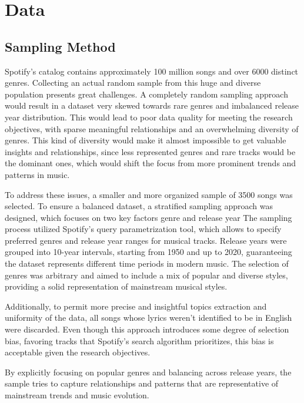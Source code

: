 \chapter{Data}
\label{cha:data}



\section{Sampling Method}
\label{sec:samplingmethod}

Spotify’s catalog contains approximately 100 million songs and over 6000 distinct genres.
Collecting an actual random sample from this huge and diverse population presents great
challenges. A completely random sampling approach would result in a dataset very
skewed towards rare genres and imbalanced release year distribution. This would lead to
poor data quality for meeting the research objectives, with sparse meaningful relationships
and an overwhelming diversity of genres. \textbf{}
This kind of diversity would make it almost impossible to get valuable insights and relationships, since less represented genres and rare tracks would be the dominant ones, which would shift the focus from more prominent trends and patterns in music.


To address these issues, a smaller and more organized sample of 3500 songs was
selected. To ensure a balanced dataset, a stratified sampling approach was designed, which focuses on two key factors genre and release year The sampling process utilized Spotify’s query parametrization tool, which allows to specify preferred genres and release
year ranges for musical tracks. Release years were grouped into 10-year intervals, starting
from 1950 and up to 2020, guaranteeing the dataset represents different time periods in
modern music. The selection of genres was arbitrary and aimed to include a mix of popular
and diverse styles, providing a solid representation of mainstream musical styles.


Additionally, to permit more precise and insightful topics extraction and uniformity of the data, all songs whose lyrics weren’t identified to be in English were discarded.
Even though this approach introduces some degree of selection bias, favoring tracks that
Spotify’s search algorithm prioritizes, this bias is acceptable given the research objectives.


By explicitly focusing on popular genres and balancing across release years, the sample tries
to capture relationships and patterns that are representative of mainstream trends and music
evolution.

